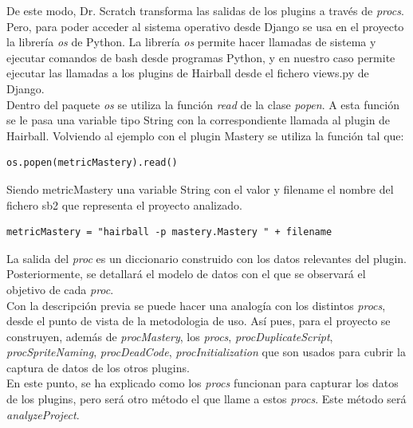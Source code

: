 \documentclass[a4paper, 12pt]{book}
\begin{document}
De este modo, Dr. Scratch transforma las salidas de los plugins a través de \emph{procs}. 
Pero, para poder acceder al sistema operativo desde Django se usa en el proyecto la
librería \emph{os} de Python. La librería \emph{os} permite hacer llamadas de sistema y
ejecutar comandos de bash desde programas Python, y en nuestro caso permite ejecutar las
llamadas a los plugins de Hairball desde el fichero views.py de Django. \\

Dentro del paquete \emph{os} se utiliza la función \emph{read} de la clase \emph{popen}.
A esta función se le pasa una variable tipo String con la correspondiente llamada al 
plugin de Hairball. Volviendo al ejemplo con el plugin Mastery se utiliza la función 
tal que: \\

\begingroup
\fontsize{8pt}{9pt}\selectfont
\begin{verbatim}
os.popen(metricMastery).read()
\end{verbatim}
\endgroup

Siendo metricMastery una variable String con el valor y filename el nombre del fichero
sb2 que representa el proyecto analizado. \\

\begingroup
\fontsize{8pt}{9pt}\selectfont
\begin{verbatim}
metricMastery = "hairball -p mastery.Mastery " + filename
\end{verbatim}
\endgroup

La salida del \emph{proc} es un diccionario construido con los datos relevantes del 
plugin. Posteriormente, se detallará el modelo de datos con el que se observará el
objetivo de cada \emph{proc}. \\

Con la descripción previa se puede hacer una analogía con los distintos \emph{procs}, desde
el punto de vista de la metodologia de uso. Así pues, para el proyecto se construyen, 
además de \emph{procMastery}, los \emph{procs}, \emph{procDuplicateScript}, 
\emph{procSpriteNaming}, \emph{procDeadCode}, \emph{procInitialization} que son usados
para cubrir la captura de datos de los otros plugins. \\

En este punto, se ha explicado como los \emph{procs} funcionan para capturar los datos
de los plugins, pero será otro método el que llame a estos \emph{procs}. Este método 
será \emph{analyzeProject}.
\end{document}
